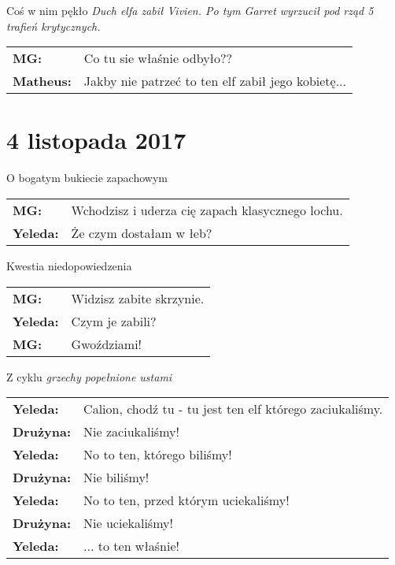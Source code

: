 \documentclass[10pt,twoside,twocolumn]{book}
\begin{document}
\begin{rpg-quotebox}{Coś w nim pękło}
   \textit{Duch elfa zabił Vivien. Po tym Garret wyrzucił pod rząd 5 trafień krytycznych.}\\
   \begin{tabularx}{\columnwidth}{lX}
      \textbf{MG:} & Co tu sie właśnie odbyło??\\
      \textbf{Matheus:} & Jakby nie patrzeć to ten elf zabił jego kobietę...\\
   \end{tabularx}
\end{rpg-quotebox}

\section*{4 listopada 2017}

\begin{rpg-quotebox}{O bogatym bukiecie zapachowym}
   \begin{tabularx}{\columnwidth}{lX}
      \textbf{MG:} & Wchodzisz i uderza cię zapach klasycznego lochu.\\
      \textbf{Yeleda:} & Że czym dostałam w łeb?\\
   \end{tabularx}
\end{rpg-quotebox}

\begin{rpg-quotebox}{Kwestia niedopowiedzenia}
   \begin{tabularx}{\columnwidth}{lX}
      \textbf{MG:} & Widzisz zabite skrzynie.\\
      \textbf{Yeleda:} & Czym je zabili?\\
      \textbf{MG:} & Gwoździami!\\
   \end{tabularx}
\end{rpg-quotebox}

\begin{rpg-quotebox}{Z cyklu \emph{grzechy popełnione ustami}}
   \begin{tabularx}{\columnwidth}{lX}
      \textbf{Yeleda:} & Calion, chodź tu - tu jest ten elf którego zaciukaliśmy.\\
      \textbf{Drużyna:} & Nie zaciukaliśmy!\\
      \textbf{Yeleda:} & No to ten, którego biliśmy!\\
      \textbf{Drużyna:} & Nie biliśmy!\\
      \textbf{Yeleda:} & No to ten, przed którym uciekaliśmy!\\
      \textbf{Drużyna:} & Nie uciekaliśmy!\\
      \textbf{Yeleda:} & ... to ten właśnie!\\
   \end{tabularx}
\end{rpg-quotebox}
\end{document}

